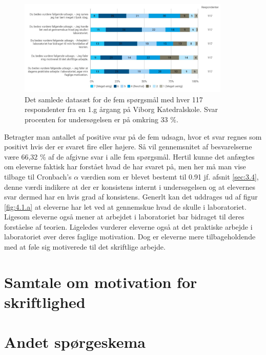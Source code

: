 \begin{figure}[h!]
	\centering
	\includegraphics[width=0.9\textwidth]{Figs/Sammenlign}
	\caption{Det samlede datasæt for de fem spørgsmål med hver 117 respondenter fra en 1.g årgang på Viborg Katedralskole. Svar procenten for undersøgelsen er på omkring 33 \%. }
	\label{fig:4.1.a}
\end{figure}
Betragter man antallet af positive svar på de fem udsagn, hvor et svar regnes som positivt hvis der er svaret fire eller højere. Så vil gennemsnitet af besvarelserne være 66,32 \% af de afgivne svar i alle fem spørgsmål.  Hertil kunne det anfægtes om eleverne faktisk har forstået hvad de har svaret på, men her må man vise tilbage til Cronbach's $\alpha$ værdien som er blevet bestemt til 0.91 jf. afsnit \vref{sec:3.4}, denne værdi indikere at der er konsistens internt i undersøgelsen og at elevernes svar dermed har en hvis grad af konsistens. Generlt kan det uddrages ud af figur \vref{fig:4.1.a} at eleverne har let ved at gennemskue hvad de skulle i laboratoriet. Ligesom eleverne også mener at arbejdet i laboratoriet bar bidraget til deres forståelse af teorien. Ligeledes vurderer eleverne også at det praktiske arbejde i laboratoriet øver deres faglige motivation. Dog er eleverne mere tilbageholdende med at føle sig motiverede til det skriftlige arbejde. 


\section{Samtale om motivation for skriftlighed}
\label{sec:4.2}

\section{Andet spørgeskema}
\label{sec:4.3}

